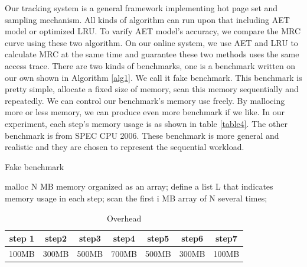 \documentclass[10pt,twocolumn]{article}
\begin{document}
Our tracking system is a general framework implementing hot page set and sampling mechanism. All kinds of algorithm can run upon that including AET model or optimized LRU. To varify AET model's accuracy, we compare the MRC curve using these two algorithm. On our online system, we use AET and LRU to calculate MRC at the same time and guarantee these two methods uses the same access trace. There are two kinds of benchmarks, one is a benchmark written on our own shown in Algorithm \ref{alg1}. We call it fake benchmark. This benchmark is pretty simple, allocate a fixed size of memory, scan this memory sequentially and repeatedly. We can control our benchmark's memory use freely. By mallocing more or less memory, we can produce even more benchmark if we like. In our experiment, each step's memory usage is as shown in table \ref{table4}. The other benchmark is from SPEC CPU 2006\cite{Henning2000spec}. These benchmark is more general and realistic and they are chosen to represent the sequential workload. 

\begin{algorithm}
	\caption{Fake benchmark}
	\label{alg1}
		\begin{algorithmic}  
			\STATE malloc N MB memory organized as an array;
			\STATE define a list L that indicates memory usage in each step;
			\STATE scan the first i MB array of N several times;\  
			\ENDFOR  
		\end{algorithmic}  
\end{algorithm}

\vspace{3pt}
\renewcommand\arraystretch{1.5}
\begin{table}[htbp]
	\caption{Overhead}\label{table3}
	\centering
	\begin{tabular}{|c|c|c|c|c|c|c|}
		\hline
		step 1 & step2 & step3 & step4 & step5 & step6 & step7 \\
		\hline
		100MB & 300MB & 500MB & 700MB & 500MB & 300MB & 100MB \\
		\hline
	\end{tabular}
\end{table}
\end{document}
